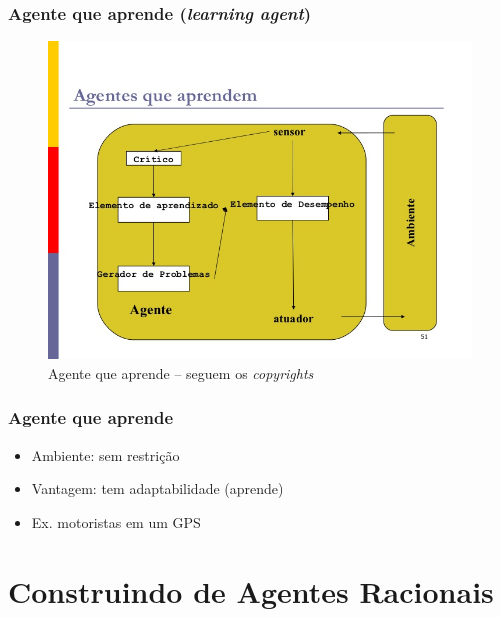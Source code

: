 \begin{frame} %

 \frametitle{Agente que aprende (\textit{learning agent})}

\begin{figure}[!ht]
  \centering
  \includegraphics[height =.6\textheight,width=.7\textwidth]
  {figuras/agentes_que_aprendem.jpg}
  \caption{Agente que aprende -- seguem os \textit{copyrights}}
\end{figure}

\end{frame}




\begin{frame} %

    \frametitle{Agente que aprende}

\begin{itemize}
  \item Ambiente: sem restrição
  
  \item Vantagem:  tem adaptabilidade (aprende)
  
  \item Ex.  motoristas em um GPS
  
\end{itemize}
\end{frame}



\section{Construindo de Agentes Racionais}


